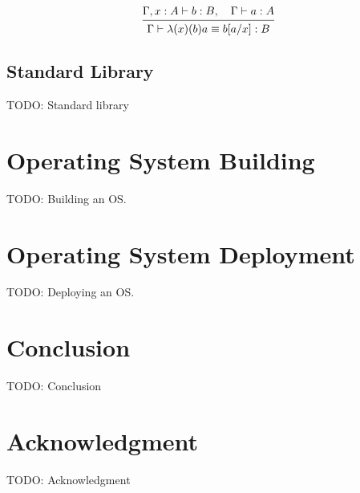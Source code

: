 \documentclass[conference]{IEEEtran}
\begin{document}
\[
\begin{prooftree}
    \hypo { \Gamma, x : A \vdash b : B,
            \quad \Gamma \vdash a : A }
    \infer1 { \Gamma \vdash \lambda(x)(b) a \equiv b[a/x] : B }
\end{prooftree}
\]

\subsection{Standard Library}

TODO: Standard library

\section{Operating System Building}

TODO: Building an OS.

\section{Operating System Deployment}

TODO: Deploying an OS.

\section{Conclusion}

TODO: Conclusion

\section*{Acknowledgment}

TODO: Acknowledgment
\end{document}

